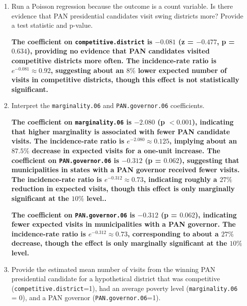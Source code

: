 \documentclass[12pt,letterpaper]{article}
\begin{document}
\begin{enumerate}
	\item [(a)]
	Run a Poisson regression because the outcome is a count variable. Is there evidence that PAN presidential candidates visit swing districts more? Provide a test statistic and p-value.
	
		 
		
		\textbf{The coefficient on \texttt{competitive.district} is $-0.081$ (z = $-0.477$, p = $0.634$), providing no evidence that PAN candidates visited competitive districts more often. The incidence-rate ratio is $e^{-0.081} \approx 0.92$, suggesting about an $8\%$ lower expected number of visits in competitive districts, though this effect is not statistically significant.}
		
		
	\item [(b)]
	Interpret the \texttt{marginality.06} and \texttt{PAN.governor.06} coefficients.
	
		 
		
		\textbf{The coefficient on \texttt{marginality.06} is $-2.080$ (p $< 0.001$), indicating that higher marginality is associated with fewer PAN candidate visits. The incidence-rate ratio is $e^{-2.080} \approx 0.125$, implying about an $87.5\%$ decrease in expected visits for a one-unit increase. The coefficient on \texttt{PAN.governor.06} is $-0.312$ (p = $0.062$), suggesting that municipalities in states with a PAN governor received fewer visits. The incidence-rate ratio is $e^{-0.312} \approx 0.73$, indicating roughly a $27\%$ reduction in expected visits, though this effect is only marginally significant at the $10\%$ level..}
		
		
		\textbf{The coefficient on \texttt{PAN.governor.06} is $-0.312$ (p = $0.062$), indicating fewer expected visits in municipalities with a PAN governor. The incidence-rate ratio is $e^{-0.312} \approx 0.73$, corresponding to about a $27\%$ decrease, though the effect is only marginally significant at the $10\%$ level.}
	
	
	\item [(c)]
	Provide the estimated mean number of visits from the winning PAN presidential candidate for a hypothetical district that was competitive (\texttt{competitive.district}=1), had an average poverty level (\texttt{marginality.06} = 0), and a PAN governor (\texttt{PAN.governor.06}=1).
	
		 
		

\end{enumerate}
\end{document}
